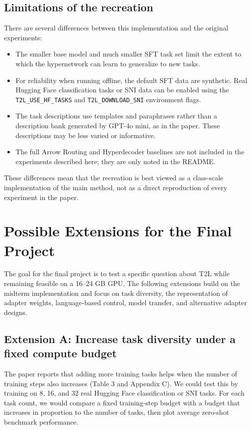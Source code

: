 \documentclass{article}
\begin{document}
\subsection{Limitations of the recreation}

There are several differences between this implementation and the original experiments:

\begin{itemize}
  \item The smaller base model and much smaller SFT task set limit the extent to which the hypernetwork can learn to generalize to new tasks.
  \item For reliability when running offline, the default SFT data are synthetic. Real Hugging Face classification tasks or SNI data can be enabled using the \texttt{T2L\_USE\_HF\_TASKS} and \texttt{T2L\_DOWNLOAD\_SNI} environment flags.
  \item The task descriptions use templates and paraphrases rather than a description bank generated by GPT-4o mini, as in the paper. These descriptions may be less varied or informative.
  \item The full Arrow Routing and Hyperdecoder baselines are not included in the experiments described here; they are only noted in the README.
\end{itemize}

These differences mean that the recreation is best viewed as a class-scale implementation of the main method, not as a direct reproduction of every experiment in the paper.

\section{Possible Extensions for the Final Project}

The goal for the final project is to test a specific question about T2L while remaining feasible on a 16--24 GB GPU. The following extensions build on the midterm implementation and focus on task diversity, the representation of adapter weights, language-based control, model transfer, and alternative adapter designs.

\subsection{Extension A: Increase task diversity under a fixed compute budget}

The paper reports that adding more training tasks helps when the number of training steps also increases (Table 3 and Appendix C). We could test this by training on 8, 16, and 32 real Hugging Face classification or SNI tasks. For each task count, we would compare a fixed training-step budget with a budget that increases in proportion to the number of tasks, then plot average zero-shot benchmark performance.
\end{document}
